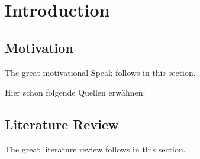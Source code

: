 \chapter{Introduction}\label{c:intro}

\section{Motivation}\label{c:intro:s:motivation}

The great motivational Speak follows in this section.

Hier schon folgende Quellen erwähnen:

\cite{Astrom1973}

\section{Literature Review}\label{c:intro:s:literature}

The great literature review follows in this section.